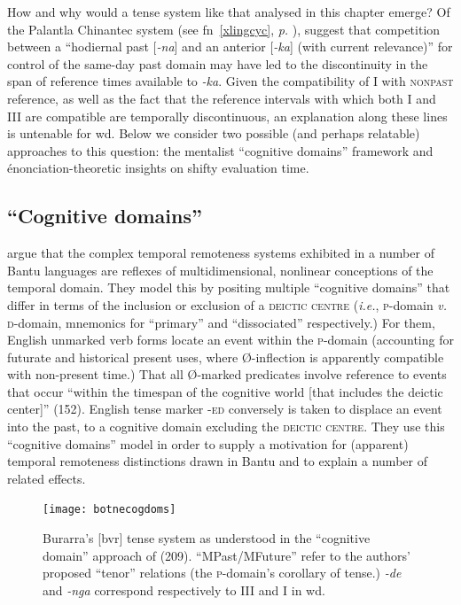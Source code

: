 How and why would a tense system like that analysed in this chapter emerge? Of the Palantla Chinantec system (see fn~\ref{xlingcyc}, \textit{p.} \pageref{xlingcyc}), \citet[104]{Bybee1994} suggest that competition between a ``hodiernal past [\textit{-na}] and an anterior [\textit{-ka}] (with current relevance)'' for control of the same-day past domain may have led to the discontinuity in the span of reference times available to \textit{-ka}. Given the compatibility of \gls{I} with \textsc{nonpast} reference, as well as the fact that the reference intervals with which both \gls{I} and \gls{III} are compatible are temporally discontinuous, an explanation along these lines is untenable for \gls{wd}. Below we consider two possible (and perhaps relatable) approaches to this question: the mentalist ``cognitive domains'' framework and énonciation-theoretic insights on shifty evaluation time.


\subsection{``Cognitive domains''}

\citet[154, \textit{passim}]{Botne2008} argue that the complex temporal remoteness systems exhibited in a number of Bantu languages are reflexes of multidimensional, nonlinear conceptions of the temporal domain. They model this by positing multiple ``cognitive domains'' that differ in terms of the inclusion or exclusion of a \textsc{deictic centre} (\textit{i.e.}, \textsc{p-}domain \textit{v.} \textsc{d-}domain, mnemonics for ``primary'' and ``dissociated'' respectively.) For them, English unmarked verb forms locate an event within the \textsc{p}-domain (accounting for futurate and historical present uses, where Ø-inflection is apparently compatible with non-present time.) That all Ø-marked predicates involve reference to events that occur ``within the timespan of the cognitive world [that includes the deictic center]'' (152). English tense marker \textsc{-ed} conversely is taken to displace an event into the past, to a cognitive domain excluding the \textsc{deictic centre}. They use this ``cognitive domains'' model in order to supply a motivation for (apparent) temporal remoteness distinctions drawn in Bantu and to explain a number of related effects.

\begin{figure}
	\centering
	\caption[Burarran ``cognitive domains'' \citep{Botne2008}]{Burarra's [\gls{bvr}] tense system as understood in the ``cognitive domain'' approach of \citealp{Botne2008} (209). ``MPast/MFuture'' refer to the authors' proposed ``tenor'' relations (the \textsc{p}-domain's corollary of tense.) \textit{-de} and \textit{-nga} correspond respectively to \gls{III} and \gls{I} in \gls{wd}.}
	\label{fig:botne}
	\texttt{[image: botnecogdoms]}
\end{figure}

